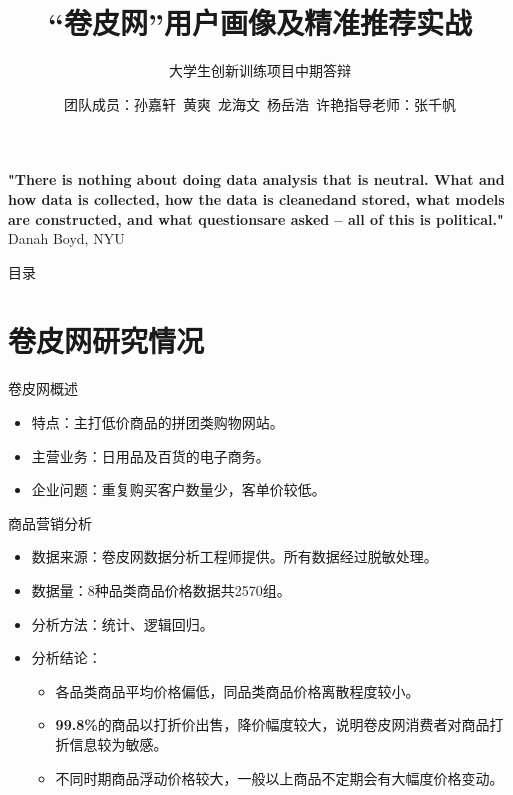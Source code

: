 \documentclass[10pt,aspectratio=32,handout]{beamer}
\title[中期答辩]{“卷皮网”用户画像及精准推荐实战}
\subtitle{大学生创新训练项目中期答辩}
\author[用户画像与机器学习实战]{团队成员：孙嘉轩\ 黄爽\ 龙海文\ 杨岳浩\ 许艳\newline \newline 指导老师：张千帆}
\institute[]{华中科技大学管理学院}
\begin{document}

\frame{\titlepage}
\begin{frame}
\textbf{"There is nothing about doing data analysis that is neutral.\newline\newline
What and how data is collected, how the data is cleaned\newline\newline and
stored, what models are constructed, and what questions\newline\newline are asked – all of this is political."}
\newline\newline Danah Boyd, NYU

\end{frame}

\begin{frame}{目录}
\tableofcontents
\end{frame}

\section{卷皮网研究情况}

\begin{frame}{卷皮网概述}
\begin{itemize}
\item 特点：主打低价商品的拼团类购物网站。\newline
\item 主营业务：日用品及百货的电子商务。\newline
\item 企业问题：重复购买客户数量少，客单价较低。
\end{itemize}
\end{frame}

\begin{frame}{商品营销分析}
\begin{itemize}
\item 数据来源：卷皮网数据分析工程师提供。所有数据经过脱敏处理。\newline
\item 数据量：8种品类商品价格数据共2570组。\newline
\item 分析方法：统计、逻辑回归。\newline
\item 分析结论：\newline
  \begin{itemize}
    \item 各品类商品平均价格偏低，同品类商品价格离散程度较小。\newline
    \item \textbf{99.8\%}的商品以打折价出售，降价幅度较大，说明卷皮网消费者对商品打折信息较为敏感。\newline
    \item 不同时期商品浮动价格较大，一般以上商品不定期会有大幅度价格变动。
  \end{itemize}
\end{itemize}
\end{frame}
\end{document}
